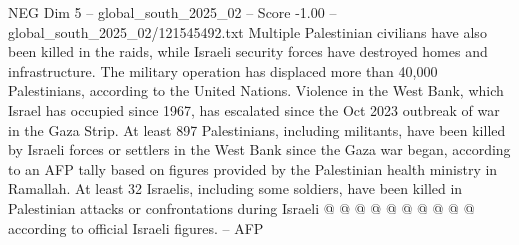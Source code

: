 \begin{textsample}{NEG Dim 5 – global\_south\_2025\_02 – Score -1.00 – global\_south\_2025\_02/121545492.txt}
Multiple Palestinian civilians have also been killed in the raids, while Israeli security forces have destroyed homes and infrastructure.
The military operation has displaced more than 40,000 Palestinians, according to the United Nations.
Violence in the West Bank, which Israel has occupied since 1967, has escalated since the Oct 2023 outbreak of war in the Gaza Strip.
At least 897 Palestinians, including militants, have been killed by Israeli forces or settlers in the West Bank since the Gaza war began, according to an AFP tally based on figures provided by the Palestinian health ministry in Ramallah.
At least 32 Israelis, including some soldiers, have been killed in Palestinian attacks or confrontations during Israeli @ @ @ @ @ @ @ @ @ @ according to official Israeli figures. -- AFP

\end{textsample}
